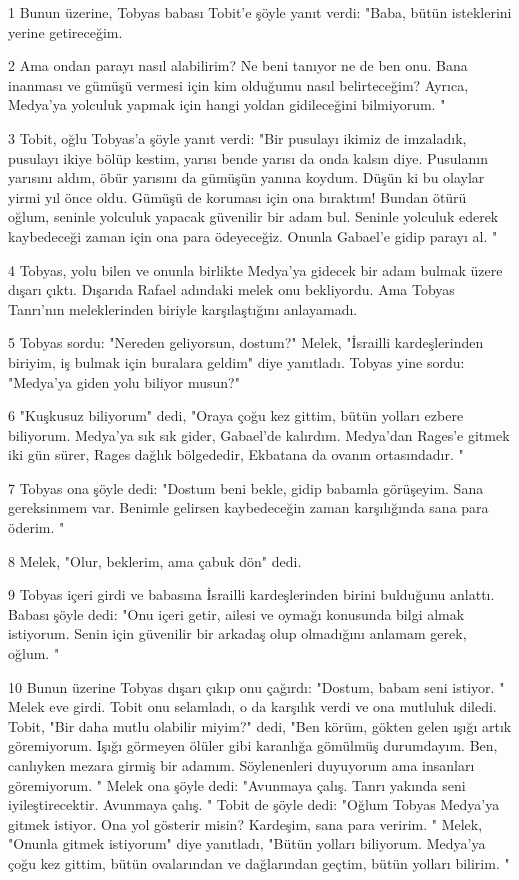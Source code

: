 \par 1 Bunun üzerine, Tobyas babası Tobit'e şöyle yanıt verdi: "Baba, bütün isteklerini yerine getireceğim.
\par 2 Ama ondan parayı nasıl alabilirim? Ne beni tanıyor ne de ben onu. Bana inanması ve gümüşü vermesi için kim olduğumu nasıl belirteceğim? Ayrıca, Medya'ya yolculuk yapmak için hangi yoldan gidileceğini bilmiyorum. "
\par 3 Tobit, oğlu Tobyas'a şöyle yanıt verdi: "Bir pusulayı ikimiz de imzaladık, pusulayı ikiye bölüp kestim, yarısı bende yarısı da onda kalsın diye. Pusulanın yarısını aldım, öbür yarısını da gümüşün yanına koydum. Düşün ki bu olaylar yirmi yıl önce oldu. Gümüşü de koruması için ona bıraktım! Bundan ötürü oğlum, seninle yolculuk yapacak güvenilir bir adam bul. Seninle yolculuk ederek kaybedeceği zaman için ona para ödeyeceğiz. Onunla Gabael'e gidip parayı al. "
\par 4 Tobyas, yolu bilen ve onunla birlikte Medya'ya gidecek bir adam bulmak üzere dışarı çıktı. Dışarıda Rafael adındaki melek onu bekliyordu. Ama Tobyas Tanrı'nın meleklerinden biriyle karşılaştığını anlayamadı.
\par 5 Tobyas sordu: "Nereden geliyorsun, dostum?" Melek, "İsrailli kardeşlerinden biriyim, iş bulmak için buralara geldim" diye yanıtladı. Tobyas yine sordu: "Medya'ya giden yolu biliyor musun?"
\par 6 "Kuşkusuz biliyorum" dedi, "Oraya çoğu kez gittim, bütün yolları ezbere biliyorum. Medya'ya sık sık gider, Gabael'de kalırdım. Medya'dan Rages'e gitmek iki gün sürer, Rages dağlık bölgededir, Ekbatana da ovanın ortasındadır. "
\par 7 Tobyas ona şöyle dedi: "Dostum beni bekle, gidip babamla görüşeyim. Sana gereksinmem var. Benimle gelirsen kaybedeceğin zaman karşılığında sana para öderim. "
\par 8 Melek, "Olur, beklerim, ama çabuk dön" dedi.
\par 9 Tobyas içeri girdi ve babasına İsrailli kardeşlerinden birini bulduğunu anlattı. Babası şöyle dedi: "Onu içeri getir, ailesi ve oymağı konusunda bilgi almak istiyorum. Senin için güvenilir bir arkadaş olup olmadığını anlamam gerek, oğlum. "
\par 10 Bunun üzerine Tobyas dışarı çıkıp onu çağırdı: "Dostum, babam seni istiyor. " Melek eve girdi. Tobit onu selamladı, o da karşılık verdi ve ona mutluluk diledi. Tobit, "Bir daha mutlu olabilir miyim?" dedi, "Ben körüm, gökten gelen ışığı artık göremiyorum. Işığı görmeyen ölüler gibi karanlığa gömülmüş durumdayım. Ben, canlıyken mezara girmiş bir adamım. Söylenenleri duyuyorum ama insanları göremiyorum. " Melek ona şöyle dedi: "Avunmaya çalış. Tanrı yakında seni iyileştirecektir. Avunmaya çalış. " Tobit de şöyle dedi: "Oğlum Tobyas Medya'ya gitmek istiyor. Ona yol gösterir misin? Kardeşim, sana para veririm. " Melek, "Onunla gitmek istiyorum" diye yanıtladı, "Bütün yolları biliyorum. Medya'ya çoğu kez gittim, bütün ovalarından ve dağlarından geçtim, bütün yolları bilirim. "
